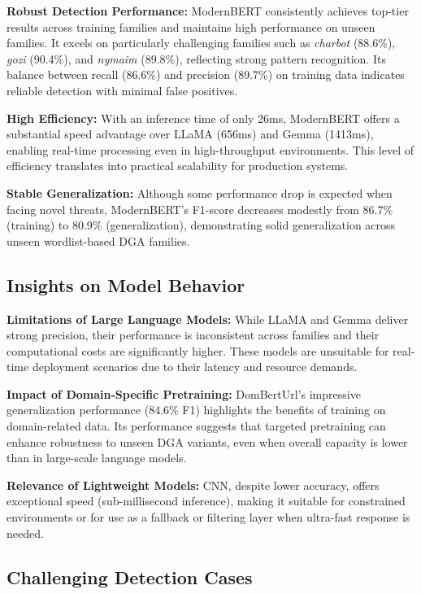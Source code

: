 \documentclass[a4paper]{llncs}
\begin{document}
\textbf{Robust Detection Performance:} ModernBERT consistently achieves top-tier results across training families and maintains high performance on unseen families. It excels on particularly challenging families such as \textit{charbot} (88.6\%), \textit{gozi} (90.4\%), and \textit{nymaim} (89.8\%), reflecting strong pattern recognition. Its balance between recall (86.6\%) and precision (89.7\%) on training data indicates reliable detection with minimal false positives.

\textbf{High Efficiency:} With an inference time of only 26ms, ModernBERT offers a substantial speed advantage over LLaMA (656ms) and Gemma (1413ms), enabling real-time processing even in high-throughput environments. This level of efficiency translates into practical scalability for production systems.

\textbf{Stable Generalization:} Although some performance drop is expected when facing novel threats, ModernBERT’s F1-score decreases modestly from 86.7\% (training) to 80.9\% (generalization), demonstrating solid generalization across unseen wordlist-based DGA families.

\subsection{Insights on Model Behavior}

\textbf{Limitations of Large Language Models:} While LLaMA and Gemma deliver strong precision, their performance is inconsistent across families and their computational costs are significantly higher. These models are unsuitable for real-time deployment scenarios due to their latency and resource demands.

\textbf{Impact of Domain-Specific Pretraining:} DomBertUrl’s impressive generalization performance (84.6\% F1) highlights the benefits of training on domain-related data. Its performance suggests that targeted pretraining can enhance robustness to unseen DGA variants, even when overall capacity is lower than in large-scale language models.

\textbf{Relevance of Lightweight Models:} CNN, despite lower accuracy, offers exceptional speed (sub-millisecond inference), making it suitable for constrained environments or for use as a fallback or filtering layer when ultra-fast response is needed.

\subsection{Challenging Detection Cases}
\end{document}
